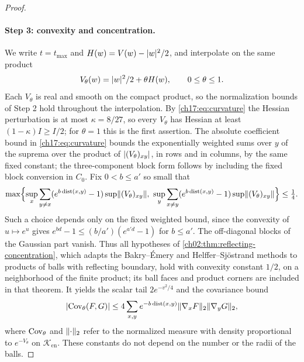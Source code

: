 \begin{proof}
\paragraph{Step 3: convexity and concentration.}
We write $t=t_{\max}$ and $H(w)=V(w)-\lvert w\rvert^2/2$, and interpolate on the same product
\[
 V_\theta(w)=\lvert w\rvert^2/2+\theta H(w),\qquad0\le\theta\le1.
\]
Each $V_\theta$ is real and smooth on the compact product, so the normalization bounds of Step 2 hold throughout the interpolation. By \eqref{ch17:eq:curvature} the Hessian perturbation is at most $\kappa=8/27$, so every $V_\theta$ has Hessian at least $(1-\kappa)I\ge I/2$; for $\theta=1$ this is the first assertion. The absolute coefficient bound in \eqref{ch17:eq:curvature} bounds the exponentially weighted sums over $y$ of the suprema over the product of $\lvert (V_\theta)_{xy}\rvert$, in rows and in columns, by the same fixed constant; the three-component block form follows by including the fixed block conversion in $C_0$. Fix $0<b\le a'$ so small that
\[
 \max\Bigl\{\sup_x\sum_{y\ne x}(e^{b\operatorname{dist}(x,y)}-1)\sup\lVert (V_\theta)_{xy}\rVert,\ \sup_y\sum_{x\ne y}(e^{b\operatorname{dist}(x,y)}-1)\sup\lVert (V_\theta)_{xy}\rVert\Bigr\}\le\tfrac14.
\]
Such a choice depends only on the fixed weighted bound, since the convexity of $u\mapsto e^u$ gives $e^{bd}-1\le(b/a')(e^{a'd}-1)$ for $b\le a'$. The off-diagonal blocks of the Gaussian part vanish. Thus all hypotheses of \cref{ch02:thm:reflecting-concentration}, which adapts the Bakry--\'Emery and Helffer--Sj\"ostrand methods \cite{BakryEmery1985,HelfferSjostrand1994} to products of balls with reflecting boundary, hold with convexity constant $1/2$, on a neighborhood of the finite product; its ball faces and product corners are included in that theorem. It yields the scalar tail $2e^{-v^2/4}$ and the covariance bound
\begin{equation}\label{ch17:eq:ambient-covariance}
 \lvert \operatorname{Cov}_\theta(F,G)\rvert\le4\sum_{x,y}e^{-b\operatorname{dist}(x,y)}\lVert \nabla_xF\rVert_2\lVert \nabla_yG\rVert_2,
\end{equation}
where $\operatorname{Cov}_\theta$ and $\lVert \cdot\rVert_2$ refer to the normalized measure with density proportional to $e^{-V_\theta}$ on $\mathcal K_{\mathrm{en}}$. These constants do not depend on the number or the radii of the balls.


\end{proof}
